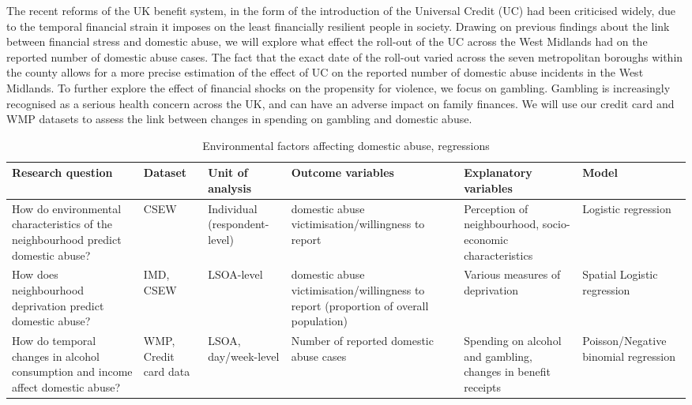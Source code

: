 \documentclass[11pt, a4paper]{article}
\begin{document}
 The recent reforms of the UK benefit system, in the form of the introduction of the Universal Credit (UC) had been criticised widely, due to the temporal financial strain it imposes on the least financially resilient people in society. Drawing on previous findings about the link between financial stress and domestic abuse, we will explore what effect the roll-out of the UC across the West Midlands had on the reported number of domestic abuse cases. The fact that the exact date of the roll-out varied across the seven metropolitan boroughs within the county allows for a more precise estimation of the effect of UC on the reported number of domestic abuse incidents in the West Midlands. To further explore the effect of financial shocks on the propensity for violence, we focus on gambling. Gambling is increasingly recognised as a serious health concern across the UK, and can have an adverse impact on family finances. We will use our credit card and WMP datasets to assess the link between changes in spending on gambling and domestic abuse.



\begin{table}[!htbp]
\caption{Environmental factors affecting domestic abuse, regressions}
  \begin{threeparttable}[t]
  \centering
       \begin{tabular}{ L{2.8cm}  C{1.8cm}  C{1.8cm}  C{3.2cm}  C{2.8cm}  C{2cm} }
    \toprule
     \textbf{Research question} & \textbf{Dataset}    & \textbf{Unit of analysis} & \textbf{Outcome variables} & \textbf{Explanatory variables} & \textbf{Model} \\
    \midrule
    How do environmental characteristics of the neighbourhood predict domestic abuse? & CSEW & Individual (respondent-level) & domestic abuse victimisation/willingness to report & Perception of neighbourhood, socio-economic characteristics & Logistic regression \\
         \midrule
          How does neighbourhood deprivation predict domestic abuse? & IMD, CSEW & LSOA-level & domestic abuse victimisation/willingness to report (proportion of overall population) & Various measures of deprivation & Spatial Logistic regression \\
         \midrule
    How do temporal changes in alcohol consumption and income affect domestic abuse? & WMP, Credit card data & LSOA, day/week-level & Number of reported domestic abuse cases & Spending on alcohol and gambling, changes in benefit receipts & Poisson/Negative binomial regression \\

     \bottomrule
  \end{tabular}
    \end{threeparttable}%
  \label{tab:addlabel}%
\end{table}%
\end{document}
